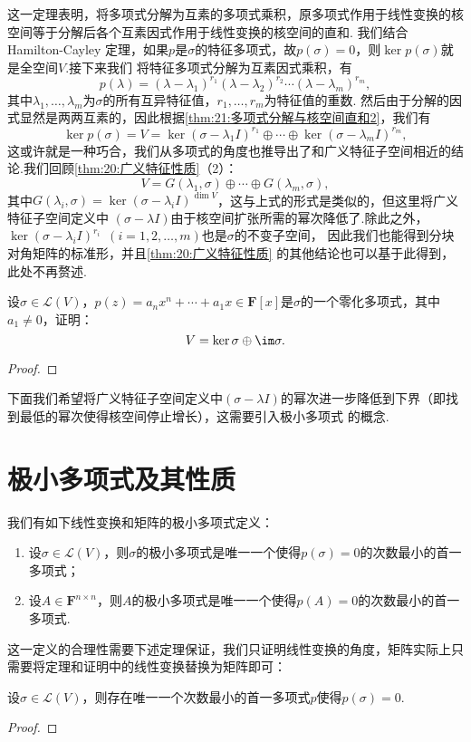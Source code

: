 这一定理表明，将多项式分解为互素的多项式乘积，原多项式作用于线性变换的核空间等于分解后各个互素因式作用于线性变换的核空间的直和.
我们结合 Hamilton-Cayley 定理，如果$p$是$\sigma$的特征多项式，故$p(\sigma)=0$，则$\ker p(\sigma)$就是全空间$V$.接下来我们
将特征多项式分解为互素因式乘积，有
\[p(\lambda)=(\lambda-\lambda_1)^{r_1}(\lambda-\lambda_2)^{r_2}\cdots(\lambda-\lambda_m)^{r_m},\]
其中$\lambda_1,\ldots,\lambda_m$为$\sigma$的所有互异特征值，$r_1,\ldots,r_m$为特征值的重数.
然后由于分解的因式显然是两两互素的，因此根据\autoref{thm:21:多项式分解与核空间直和2}，我们有
\[\ker p(\sigma)=V=\ker (\sigma-\lambda_1I)^{r_1}\oplus\cdots\oplus\ker (\sigma-\lambda_mI)^{r_m},\]
这或许就是一种巧合，我们从多项式的角度也推导出了和广义特征子空间相近的结论.我们回顾\autoref{thm:20:广义特征性质}（2）：
\[V=G(\lambda_1,\sigma)\oplus\cdots\oplus G(\lambda_m,\sigma),\]
其中$G(\lambda_i,\sigma)=\ker (\sigma-\lambda_iI)^{\dim V}$，这与上式的形式是类似的，但这里将广义特征子空间定义中
$(\sigma-\lambda I)$由于核空间扩张所需的幂次降低了.除此之外，$\ker (\sigma-\lambda_iI)^{r_i}\enspace(i=1,2,\ldots,m)$也是$\sigma$的不变子空间，
因此我们也能得到分块对角矩阵的标准形，并且\autoref{thm:20:广义特征性质} 的其他结论也可以基于此得到，此处不再赘述.
\begin{example}
    设$\sigma\in \mathcal{L}(V)$，$p(z)=a_nx^n+\cdots+a_1x\in\mathbf{F}[x]$是$\sigma$的一个零化多项式，其中$a_1\neq 0$，证明：
    \[V=\ker \sigma\oplus\im\sigma.\]
\end{example}
\begin{proof}
    
\end{proof}

下面我们希望将广义特征子空间定义中$(\sigma-\lambda I)$的幂次进一步降低到下界（即找到最低的幂次使得核空间停止增长），这需要引入极小多项式
的概念.

\section{极小多项式及其性质}
\begin{definition}
    我们有如下线性变换和矩阵的极小多项式定义：
    \begin{enumerate}[label=(\arabic*)]
        \item 设$\sigma\in \mathcal{L}(V)$，则$\sigma$的极小多项式是唯一一个使得$p(\sigma)=0$的次数最小的首一多项式；
        \item 设$A\in\mathbf{F}^{n\times n}$，则$A$的极小多项式是唯一一个使得$p(A)=0$的次数最小的首一多项式.
    \end{enumerate}
\end{definition}
这一定义的合理性需要下述定理保证，我们只证明线性变换的角度，矩阵实际上只需要将定理和证明中的线性变换替换为矩阵即可：
\begin{theorem}\label{thm:21:极小多项式存在}
    设$\sigma\in \mathcal{L}(V)$，则存在唯一一个次数最小的首一多项式$p$使得$p(\sigma)=0$.
\end{theorem}
\begin{proof}
    
\end{proof}

